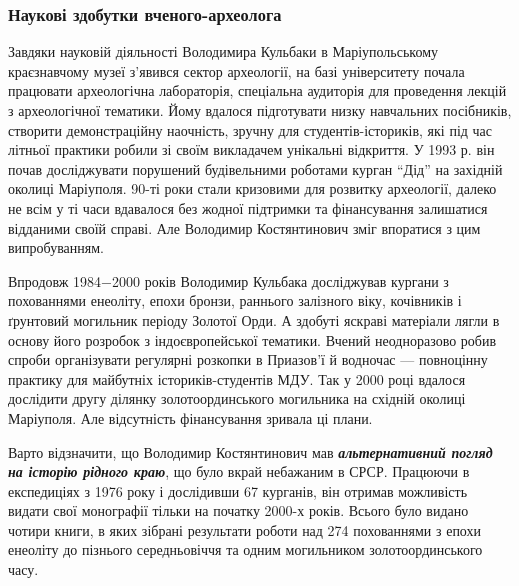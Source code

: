  
 
 
 
 

\subsubsection{Наукові здобутки вченого-археолога}


Завдяки науковій діяльності Володимира Кульбаки в Маріупольському краєзнавчому
музеї з'явився сектор археології, на базі університету почала працювати
археологічна лабораторія, спеціальна аудиторія для проведення лекцій з
археологічної тематики. Йому вдалося підготувати низку навчальних посібників,
створити демонстраційну наочність, зручну для студентів-істориків, які під час
літньої практики робили зі своїм викладачем унікальні відкриття. У 1993 р. він
почав досліджувати порушений будівельними роботами курган \enquote{Дід} на західній
околиці Маріуполя. 90-ті роки стали кризовими для розвитку археології, далеко
не всім у ті часи вдавалося без жодної підтримки та фінансування залишатися
відданими своїй справі. Але Володимир Костянтинович зміг впоратися з цим
випробуванням.

Впродовж 1984−2000 років Володимир Кульбака досліджував кургани з похованнями
енеоліту, епохи бронзи, раннього залізного віку, кочівників і ґрунтовий
могильник періоду Золотої Орди. А здобуті яскраві матеріали лягли в основу його
розробок з індоєвропейської тематики. Вчений неодноразово робив спроби
організувати регулярні розкопки в Приазов'ї й водночас — повноцінну практику
для майбутніх істориків-студентів МДУ. Так у 2000 році вдалося дослідити другу
ділянку золотоординського могильника на східній околиці Маріуполя. Але
відсутність фінансування зривала ці плани.

Варто відзначити, що Володимир Костянтинович мав \emph{\textbf{альтернативний погляд на
історію рідного краю}}, що було вкрай небажаним в СРСР. Працюючи в експедиціях з
1976 року і дослідивши 67 курганів, він отримав можливість видати свої
монографії тільки на початку 2000-х років. Всього було видано чотири книги, в
яких зібрані результати роботи над 274 похованнями з епохи енеоліту до пізнього
середньовіччя та одним могильником золотоординського часу.

